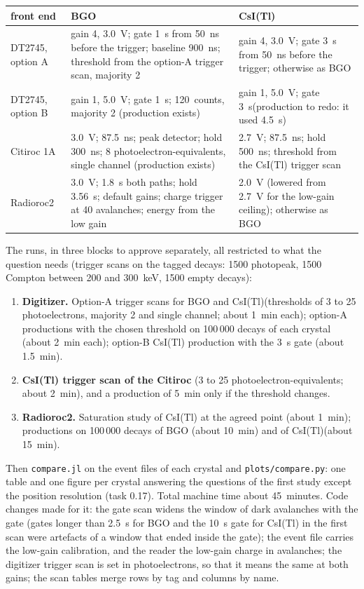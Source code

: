 \documentclass[11pt]{article}
\newcommand{\code}[1]{\texttt{#1}}
\newcommand{\us}{\textmu s\xspace}
\newcommand{\csitl}{CsI(Tl)\xspace}
\begin{document}
\begin{center}
\small
\begin{tabular}{p{} p{} p{}}
\toprule
front end & BGO & \csitl \\
\midrule
DT2745, option A & gain 4, 3.0~V; gate 1~\us from 50~ns before the trigger; baseline 900~ns; threshold from the option-A trigger scan, majority 2 & gain 4, 3.0~V; gate 3~\us from 50~ns before the trigger; otherwise as BGO \\
DT2745, option B & gain 1, 5.0~V; gate 1~\us; 120~counts, majority 2 (production exists) & gain 1, 5.0~V; gate 3~\us (production to redo: it used 4.5~\us) \\
Citiroc 1A & 3.0~V; 87.5~ns; peak detector; hold 300~ns; 8 photoelectron-equivalents, single channel (production exists) & 2.7~V; 87.5~ns; hold 500~ns; threshold from the \csitl trigger scan \\
Radioroc2 & 3.0~V; 1.8~\us both paths; hold 3.56~\us; default gains; charge trigger at 40 avalanches; energy from the low gain & 2.0~V (lowered from 2.7~V for the low-gain ceiling); otherwise as BGO \\
\bottomrule
\end{tabular}
\end{center}

The runs, in three blocks to approve separately, all restricted to what the
question needs (trigger scans on the tagged decays: 1500 photopeak, 1500
Compton between 200 and 300~keV, 1500 empty decays):

\begin{enumerate}
\item {\bf Digitizer.} Option-A trigger scans for BGO and \csitl (thresholds
  of 3 to 25 photoelectrons, majority 2 and single channel; about 1~min
  each); option-A productions with the chosen threshold on 100\,000 decays
  of each crystal (about 2~min each); option-B \csitl production with the
  3~\us gate (about 1.5~min).
\item {\bf \csitl trigger scan of the Citiroc} (3 to 25
  photoelectron-equivalents; about 2~min), and a production of 5~min only
  if the threshold changes.
\item {\bf Radioroc2.} Saturation study of \csitl at the agreed point (about
  1~min); productions on 100\,000 decays of BGO (about 10~min) and of
  \csitl (about 15~min).
\end{enumerate}

Then \code{compare.jl} on the event files of each crystal and
\code{plots/compare.py}: one table and one figure per crystal answering the
questions of the first study except the position resolution (task 0.17).
Total machine time about 45~minutes. Code changes made for it: the gate
scan widens the window of dark avalanches with the gate (gates longer than
2.5~\us for BGO and the 10~\us gate for \csitl in the first scan were
artefacts of a window that ended inside the gate); the event file carries
the low-gain calibration, and the reader the low-gain charge in avalanches;
the digitizer trigger scan is set in photoelectrons, so that it means the
same at both gains; the scan tables merge rows by tag and columns by name.
\end{document}
